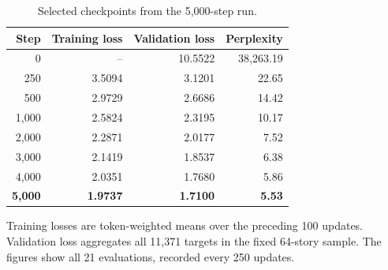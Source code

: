\begin{table}[htbp]
    \centering
    \caption{Selected checkpoints from the 5,000-step run.}
    \label{tab:validation-results}
    \begin{tabular}{rrrr}
        \toprule
        Step & Training loss & Validation loss & Perplexity \\
        \midrule
        0 & -- & 10.5522 & 38,263.19 \\
        250 & 3.5094 & 3.1201 & 22.65 \\
        500 & 2.9729 & 2.6686 & 14.42 \\
        1,000 & 2.5824 & 2.3195 & 10.17 \\
        2,000 & 2.2871 & 2.0177 & 7.52 \\
        3,000 & 2.1419 & 1.8537 & 6.38 \\
        4,000 & 2.0351 & 1.7680 & 5.86 \\
        \textbf{5,000} & \textbf{1.9737} & \textbf{1.7100} & \textbf{5.53} \\
        \bottomrule
    \end{tabular}
    \smallskip
    \begin{minipage}{0.96\linewidth}\footnotesize
    Training losses are token-weighted means over the preceding 100 updates.
    Validation loss aggregates all 11,371 targets in the fixed 64-story sample.
    The figures show all 21 evaluations, recorded every 250 updates.
    \end{minipage}
\end{table}

